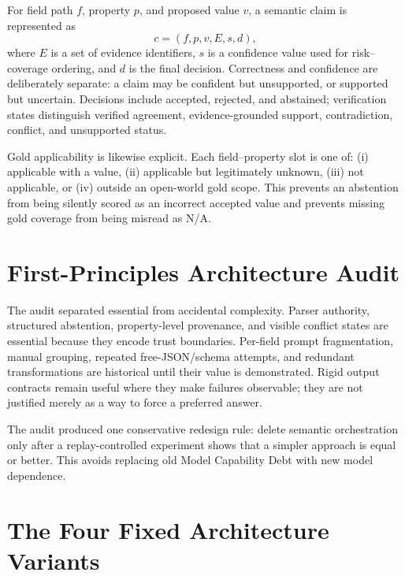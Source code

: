 \documentclass[11pt]{article}
\newcommand{\NA}{\textsf{N/A}}
\begin{document}
For field path $f$, property $p$, and proposed value $v$, a semantic claim is
represented as
\[
  c=(f,p,v,E,s,d),
\]
where $E$ is a set of evidence identifiers, $s$ is a confidence value used for
risk--coverage ordering, and $d$ is the final decision. Correctness and confidence
are deliberately separate: a claim may be confident but unsupported, or supported
but uncertain. Decisions include accepted, rejected, and abstained; verification
states distinguish verified agreement, evidence-grounded support, contradiction,
conflict, and unsupported status.

Gold applicability is likewise explicit. Each field--property slot is one of:
(i) applicable with a value, (ii) applicable but legitimately unknown, (iii) not
applicable, or (iv) outside an open-world gold scope. This prevents an abstention
from being silently scored as an incorrect accepted value and prevents missing gold
coverage from being misread as \NA.

\section{First-Principles Architecture Audit}

The audit separated essential from accidental complexity. Parser authority,
structured abstention, property-level provenance, and visible conflict states are
essential because they encode trust boundaries. Per-field prompt fragmentation,
manual grouping, repeated free-JSON/schema attempts, and redundant transformations
are historical until their value is demonstrated. Rigid output contracts remain
useful where they make failures observable; they are not justified merely as a way
to force a preferred answer.

The audit produced one conservative redesign rule: delete semantic orchestration
only after a replay-controlled experiment shows that a simpler approach is equal or
better. This avoids replacing old Model Capability Debt with new model dependence.

\section{The Four Fixed Architecture Variants}
\end{document}
